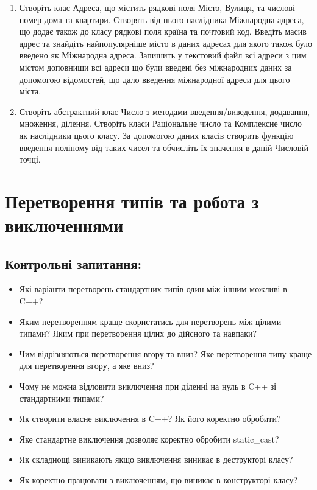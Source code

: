 \documentclass[a5paper,titlepage,openany,twoside,draft]{book_unv}%
\begin{document}
\begin{enumerate}
\item
Створіть клас Адреса, що містить рядкові поля Місто, Вулиця, та числові номер дома та квартири. 
Створять від нього наслідника Міжнародна адреса, що додає також до класу рядкові поля країна та почтовий код.
Введіть масив адрес та знайдіть найпопулярніше місто в даних адресах для якого також було введено як Міжнародна адреса. 
Запишить у текстовий файл всі адреси з цим містом доповниши всі адреси що були введені без міжнародних даних
за допомогою відомостей, що дало введення міжнародної адреси для цього міста.

\item
Створіть абстрактний клас Число з методами введення/виведення, додавання, множення, ділення.
Створіть класи Раціональне число та Комплексне число як наслідники цього класу. 
За допомогою даних класів створить функцію введення поліному від таких чисел
та обчисліть їх значення в даній Числовій точці.


\end{enumerate}


\chapter{Перетворення типів та робота з виключеннями}
%

\section{Контрольні запитання:}
\begin{itemize}
\item
  Які варіанти перетворень стандартних типів один між іншим можливі в
  C++?
\item
  Яким перетворенням краще скористатись для перетворень між цілими
  типами? Яким при перетворення цілих до дійсного та навпаки?
\item
  Чим відрізняються перетворення вгору та вниз? Яке перетворення типу
  краще для перетворення вгору, а яке вниз?
\item
  Чому не можна відловити виключення при діленні на нуль в C++ зі
  стандартними типами?
\item
  Як створити власне виключення в C++? Як його коректно обробити?
\item
  Яке стандартне виключення дозволяє коректно обробити static\_cast?
\item
  Як складнощі виникають якщо виключення виникає в деструкторі класу?
\item
  Як коректно працювати з виключенням, що виникає в конструкторі класу?
\end{itemize}
\end{document}
